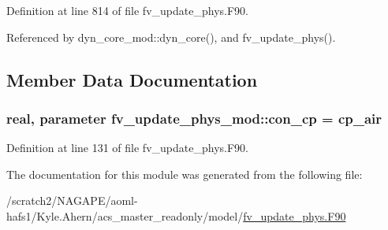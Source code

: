 Definition at line 814 of file fv\-\_\-update\-\_\-phys.\-F90.



Referenced by dyn\-\_\-core\-\_\-mod\-::dyn\-\_\-core(), and fv\-\_\-update\-\_\-phys().



\subsection{Member Data Documentation}
\subsubsection[{con\-\_\-cp}]{\setlength{\rightskip}{0pt plus 5cm}real, parameter fv\-\_\-update\-\_\-phys\-\_\-mod\-::con\-\_\-cp = cp\-\_\-air}\label{classfv__update__phys__mod_ab0a01adc2965f340c0a3706adeb96bde}


Definition at line 131 of file fv\-\_\-update\-\_\-phys.\-F90.



The documentation for this module was generated from the following file\-:\begin{DoxyCompactItemize}
\item 
/scratch2/\-N\-A\-G\-A\-P\-E/aoml-\/hafs1/\-Kyle.\-Ahern/acs\-\_\-master\-\_\-readonly/model/\hyperlink{fv__update__phys_8F90}{fv\-\_\-update\-\_\-phys.\-F90}\end{DoxyCompactItemize}

